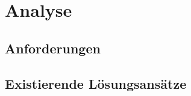 
\chapter{Analyse}
\label{ch:Analyse}



\section{Anforderungen}
\label{ch:Analyse:sec:Anforderungen}




\section{Existierende L{\"o}sungsans{\"a}tze}
\label{ch:Analyse:sec:RelatedWork}



%






